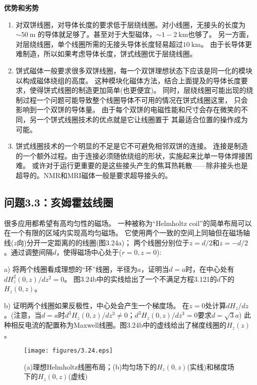 \textbf{优势和劣势}
\begin{enumerate}
	\item 对双饼线圈，对导体长度的要求低于层绕线圈。对小线圈，无接头的长度为$\sim 50\ \mathrm{m}$
	的导体就足够了。甚至对于大型磁体，$\sim 1-2\ \mathrm{km}$也够了。
	另一方面，对层绕线圈，单个线圈所需的无接头导体长度轻易超过$10\ \mathrm{km}$。
	由于长导体更难制造，所以如果考虑导体长度，饼式线圈优于层绕线圈。

	\item 饼式磁体一般要求很多双饼线圈，每一个双饼理想状态下应该是同一化的模块以构成磁体绕组的高度。
	这种模块化磁体方法，结合上面提及的导体长度要求，使得饼式线圈的制造更加简单(也更便宜)。
	同时，层绕线圈可能出现的绕制过程一个问题可能导致整个线圈导体不可用的情况在饼式线圈这里，
	只会影响到一个双饼的导体量。
	由于每个双饼的电磁性能和尺寸会存在微笑的不同，另一个饼式线圈技术的优点就是它让线圈置于
	其最适合位置的操作成为可能。

	\item 饼式线圈技术的一个明显的不足是它不可避免相邻双饼的连接。
	连接是制造的一个额外过程。由于连接必须随依绕组的形状，实施起来比单一导体焊接困难。
	或许对于运行更重要的是这些接头产生的焦耳热耗散——除非接头也是超导的。NMR和MRI磁体一般是要求超导接头的。
\end{enumerate}

\newpage

\subsection{问题3.3：亥姆霍兹线圈}
很多应用都希望有高均匀性的磁场。
一种被称为“Helmholtz coil”的简单布局可以在一个有限的区域内实现高均匀磁场。
它使用两个一致的空间上同轴但在磁场轴线($z$向)分开一定距离的的线圈(图3.24a)；
两个线圈分别位于$z = d/2$和$z = −d/2$。通过调整间隔$d$，使得磁场中心处于($r=0,z=0$):

a) 将两个线圈看成理想的“环”线圈，半径为$a$，证明当$d=a$时，在中心处有$dH^2_z(0, z)/dz^2 = 0$。
图3.24b中的实线给出了一个不满足方程3.121的$d$下的$H_z(0, z)$。

b) 证明两个线圈如果反极性，中心处会产生一个梯度场。
在$z=0$处计算$dH_z/dz$。(注意，当$d=a$时$d^3H_z(0,z)/dz^3 \neq 0$；$d^3H_z(0,z)/dz^3=0$要求$d=\sqrt{3}a$) 
此种相反电流的配置称为Maxwell线圈。图3.24b中的虚线给出了梯度线圈的$H_z(z)$。

\begin{figure}[htbp]
	\centering
	\texttt{[image: figures/3.24.eps]}
	\caption{(a)理想Helmholtz线圈布局；(b)均匀场下的$H_z(0,z)$(实线)和梯度场下的$H_z(0,z)$(虚线)}
\end{figure}

